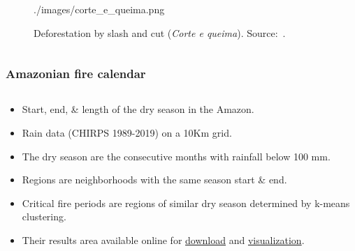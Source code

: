 \documentclass[aspectratio=169]{beamer}
\begin{document}
\begin{frame}
\begin{columns}
\begin{column}{0.5\linewidth}
\begin{figure}[h]
                {./images/corte_e_queima.png}
                \caption{Deforestation by slash and cut (\textit{Corte e queima}).
                Source:~\cite{dealmeida2022}.}
            \end{figure}
        \end{column}
    \end{columns}
\end{frame}

\begin{frame}
    \frametitle{Amazonian fire calendar}
    \begin{columns}
        \begin{column}{0.5\linewidth}
            \begin{itemize}
                \item Start, end, \& length of the dry season in the Amazon.
                \item Rain data (CHIRPS 1989-2019) on a 10Km grid.
                \item The dry season are the consecutive months with rainfall
                    below 100 mm.
                \item Regions are neighborhoods with the same season start \&
                    end.
                \item Critical fire periods are regions of similar dry season
                    determined by k-means clustering.
                \item Their results area available online for 
                    \href{https://zenodo.org/records/5706455}{download} and
                    \href{https://amazonianfirecalendar.shinyapps.io/fire_amazon}{visualization}.
            \end{itemize}
        \end{column}
\end{columns}
\end{frame}
\end{document}
